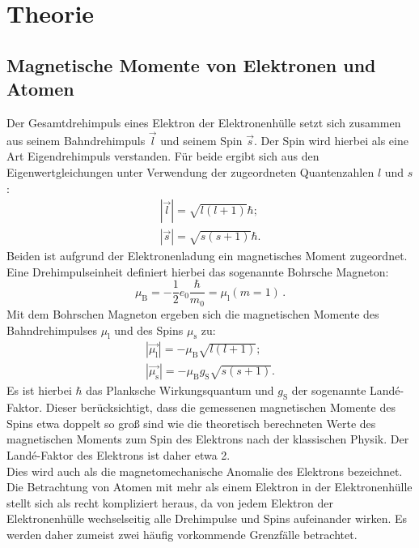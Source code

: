 \section{Theorie}
\label{sec:Theorie}
\subsection{Magnetische Momente von Elektronen und Atomen}
Der Gesamtdrehimpuls eines Elektron der Elektronenhülle setzt sich zusammen aus seinem Bahndrehimpuls $\vec{l}$ und seinem Spin $\vec{s}$.
Der Spin wird hierbei als eine Art Eigendrehimpuls verstanden.
Für beide ergibt sich aus den Eigenwertgleichungen unter Verwendung der zugeordneten Quantenzahlen $l$ und $s$:
\begin{gather}
  |\vec{l}|=\sqrt{l\left(l+1\right)}\hbar \mathrm{;}\\
  |\vec{s}|=\sqrt{s\left(s+1\right)}\hbar \mathrm{.}
\end{gather}
Beiden ist aufgrund der Elektronenladung ein magnetisches Moment zugeordnet.\\
Eine Drehimpulseinheit definiert hierbei das sogenannte Bohrsche Magneton:
\begin{equation}
	\mu_{\mathrm{B}}=-\frac{1}{2}e_0\frac{\hbar}{m_0}=\mu_{\mathrm{l}}(m=1) \, \text{.}
\end{equation}
Mit dem Bohrschen Magneton ergeben sich die magnetischen Momente des Bahndrehimpulses $\mu_{\mathrm{l}}$ und des Spins $\mu_{\mathrm{s}}$ zu:
\begin{gather}
  |\vec{\mu_{\mathrm{l}}}|=-\mu_{\mathrm{B}}\sqrt{l\left(l+1\right)}\mathrm{;}\\
  |\vec{\mu_{\mathrm{s}}}|=-\mu_{\mathrm{B}}g_{\mathrm{S}}\sqrt{s\left(s+1\right)}\mathrm{.}
\end{gather}
Es ist hierbei $\hbar$ das Planksche Wirkungsquantum und $g_{\mathrm{S}}$ der sogenannte Landé-Faktor. Dieser berücksichtigt, dass die gemessenen magnetischen Momente des Spins
etwa doppelt so groß sind wie die theoretisch berechneten Werte des magnetischen Moments zum Spin des Elektrons nach der klassischen Physik. Der Landé-Faktor des Elektrons ist daher etwa 2. \\
Dies wird auch als die magnetomechanische Anomalie des Elektrons bezeichnet.\\
Die Betrachtung von Atomen mit mehr als einem Elektron in der Elektronenhülle stellt sich als recht kompliziert heraus, da von jedem Elektron der Elektronenhülle
wechselseitig alle Drehimpulse und Spins aufeinander wirken. Es werden daher zumeist zwei häufig vorkommende Grenzfälle betrachtet.
